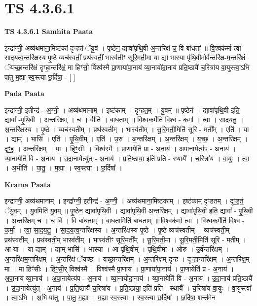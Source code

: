 \documentclass[17pt]{extarticle}
\begin{document}
\section{ TS 4.3.6.1 }

\textbf{TS 4.3.6.1 } \newline
\textbf{Samhita Paata} \newline

इन्द्रा᳚ग्नी॒ अव्य॑थमाना॒मिष्ट॑कां दृꣳहतं ॅयु॒वं । पृ॒ष्ठेन॒ द्यावा॑पृथि॒वी अ॒न्तरि॑क्षं च॒ वि बा॑धतां ॥ वि॒श्वक॑र्मा त्वा सादयत्व॒न्तरि॑क्षस्य पृ॒ष्ठे व्यच॑स्वतीं॒ प्रथ॑स्वतीं॒ भास्व॑तीꣳ सूरि॒मती॒मा या द्यां भास्या पृ॑थि॒वीमोर्व॑न्तरि॑क्ष-म॒न्तरि॑क्षं ॅयच्छा॒न्तरि॑क्षं दृꣳहा॒न्तरि॑क्षं॒ मा हिꣳ॑सी॒ र्विश्व॑स्मै प्रा॒णाया॑पा॒नाय॑ व्या॒नायो॑दा॒नाय॑ प्रति॒ष्ठायै॑ च॒रित्रा॑य वा॒युस्त्वा॒ऽभि पा॑तु म॒ह्या स्व॒स्त्या छ॒र्दिषा॒ - [  ] \newline

\textbf{Pada Paata} \newline

इन्द्रा᳚ग्नी॒ इतीन्द्र॑ - अ॒ग्नी॒ । अव्य॑थमानाम् । इष्ट॑काम् । दृꣳ॒॒ह॒त॒म् । यु॒वम् ॥ पृ॒ष्ठेन॑ । द्यावा॑पृथि॒वी इति॒ द्यावा᳚ -पृ॒थि॒वी । अ॒न्तरि॑क्षम् । च॒ । वीति॑ । बा॒ध॒ता॒म् ॥ वि॒श्वक॒र्मेति॑ वि॒श्व - क॒र्मा॒ । त्वा॒ । सा॒द॒य॒तु॒ । अ॒न्तरि॑क्षस्य । पृ॒ष्ठे । व्यच॑स्वतीम् । प्रथ॑स्वतीम् । भास्व॑तीम् । सू॒रि॒मती॒मिति॑ सूरि - मती᳚म् । एति॑ । या । द्याम् । भासि॑ । एति॑ । पृ॒थि॒वीम् । एति॑ । उ॒रु । अ॒न्तरि॑क्षम् । अ॒न्तरि॑क्षम् । य॒च्छ॒ । अ॒न्तरि॑क्षम् । दृꣳ॒॒ह॒ । अ॒न्तरि॑क्षम् । मा । हिꣳ॒॒सीः॒ । विश्व॑स्मै । प्रा॒णायेति॑ प्रा - अ॒नाय॑ । अ॒पा॒नायेत्य॑प - अ॒नाय॑ । व्या॒नायेति॑ वि - अ॒नाय॑ । उ॒दा॒नायेत्यु॑त् - अ॒नाय॑ । प्र॒ति॒ष्ठाया॒ इति॑ प्रति - स्थायै᳚ । च॒रित्रा॑य । वा॒युः । त्वा॒ । अ॒भीति॑ । पा॒तु॒ । म॒ह्या । स्व॒स्त्या । छ॒र्दिषा᳚ ।  \newline


\textbf{Krama Paata} \newline

इन्द्रा᳚ग्नी॒ अव्य॑थमानाम् । इन्द्रा᳚ग्नी॒ इतीन्द्र॑ - अ॒ग्नी॒ । अव्य॑थमाना॒मिष्ट॑काम् । इष्ट॑काम् दृꣳहतम् । दृꣳ॒॒ह॒तं॒ ॅयु॒वम् । यु॒वमिति॑ यु॒वम् ॥ पृ॒ष्ठेन॒ द्यावा॑पृथि॒वी । द्यावा॑पृथि॒वी अ॒न्तरि॑क्षम् । द्यावा॑पृथि॒वी इति॒ द्यावा᳚ - पृ॒थि॒वी । अ॒न्तरि॑क्षम् च । च॒ वि । वि बा॑धताम् । बा॒ध॒ता॒मिति॑ बाधताम् ॥ वि॒श्वक॑र्मा त्वा । वि॒श्वक॒र्मेति॑ वि॒श्व - क॒र्मा॒ । त्वा॒ सा॒द॒य॒तु॒ । सा॒द॒य॒त्व॒न्तरि॑क्षस्य । अ॒न्तरि॑क्षस्य पृ॒ष्ठे । पृ॒ष्ठे व्यच॑स्वतीम् । व्यच॑स्वती॒म् प्रथ॑स्वतीम् । प्रथ॑स्वती॒म् भास्व॑तीम् । भास्व॑तीꣳ सूरि॒मती᳚म् । सू॒रि॒मती॒मा । सू॒रि॒मती॒मिति॑ सूरि - मती᳚म् । आ या । या द्याम् । द्याम् भासि॑ । भास्या । आ पृ॑थि॒वीम् । पृ॒थि॒वीमा । ओरु । उ॒र्व॑न्तरि॑क्षम् । अ॒न्तरि॑क्षम॒न्तरि॑क्षम् । अ॒न्तरि॑क्षं ॅयच्छ । यच्छा॒न्तरि॑क्षम् । अ॒न्तरि॑क्षम् दृꣳह । दृꣳ॒॒हा॒न्तरि॑क्षम् । अ॒न्तरि॑क्ष॒म् मा । मा हिꣳ॑सीः । हिꣳ॒॒सी॒र् विश्व॑स्मै । विश्व॑स्मै प्रा॒णाय॑ । प्रा॒णाया॑पा॒नाय॑ । प्रा॒णायेति॑ प्र - अ॒नाय॑ । अ॒पा॒नाय॑ व्या॒नाय॑ । अ॒पा॒नायेत्य॑प - अ॒नाय॑ । व्या॒नायो॑दा॒नाय॑ । व्या॒नायेति॑ वि - अ॒नाय॑ । उ॒दा॒नाय॑ प्रति॒ष्ठायै᳚ । उ॒दा॒नायेत्यु॑त् - अ॒नाय॑ । प्र॒ति॒ष्ठायै॑ च॒रित्रा॑य । प्र॒ति॒ष्ठाया॒ इति॑ प्रति - स्थायै᳚ । च॒रित्रा॑य वा॒युः । वा॒युस्त्वा᳚ । त्वा॒ऽभि । अ॒भि पा॑तु । पा॒तु॒ म॒ह्या । म॒ह्या स्व॒स्त्या । स्व॒स्त्या छ॒र्दिषा᳚ । छ॒र्दिषा॒ शन्त॑मेन \newline
\end{document}
